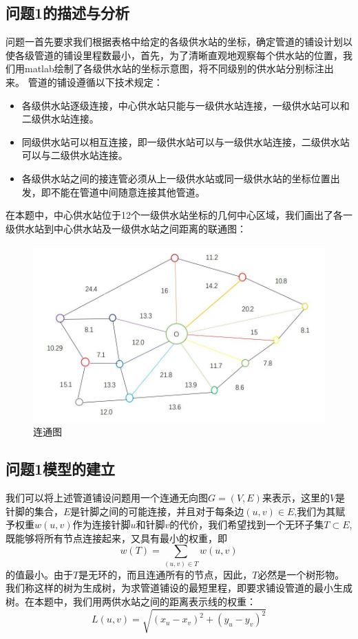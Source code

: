 \documentclass{cumcmthesis}
\begin{document}
\subsection{问题1的描述与分析}
  问题一首先要求我们根据表格中给定的各级供水站的坐标，确定管道的铺设计划以使各级管道的铺设里程数最小，首先，为了清晰直观地观察每个供水站的位置，我们用matlab绘制了各级供水站的坐标示意图，将不同级别的供水站分别标注出来。
  管道的铺设遵循以下技术规定：
\begin{itemize}
    \item 各级供水站逐级连接，中心供水站只能与一级供水站连接，一级供水站可以和二级供水站连接。
    \item 同级供水站可以相互连接，即一级供水站可以与一级供水站连接，二级供水站可以与二级供水站连接。
    \item 各级供水站之间的接连管必须从上一级供水站或同一级供水站的坐标位置出发，即不能在管道中间随意连接其他管道。
\end{itemize}

在本题中，中心供水站位于12个一级供水站坐标的几何中心区域，我们画出了各一级供水站到中心供水站及一级供水站之间距离的联通图：
\begin{figure}[!h]
  \centering
  \includegraphics[width=.6\textwidth]{figure/a.jpg}
  \caption{连通图}
  \label{fig:circuit-diagram}
\end{figure}

\subsection{问题1模型的建立}
我们可以将上述管道铺设问题用一个连通无向图$G=(V,E)$来表示，这里的$V$是针脚的集合，$E$是针脚之间的可能连接，并且对于每条边$(u,v)\in E$,我们为其赋予权重$w(u,v)$作为连接针脚$u$和针脚$v$的代价，我们希望找到一个无环子集$T\subset E$,既能够将所有节点连接起来，又具有最小的权重，即
$$w(T)=\sum\limits_{(u,v)\in T}{w(u,v)}$$
的值最小。由于$T$是无环的，而且连通所有的节点，因此，$T$必然是一个树形物。我们称这样的树为生成树，为求管道铺设的最短里程，即要求铺设管道的最小生成树。在本题中，我们用两供水站之间的距离表示线的权重：
$$L(u,v)=\sqrt{(x_{u}-x_{v})^{2}+(y_{u}-y_{v})^{2}}$$
\end{document}
